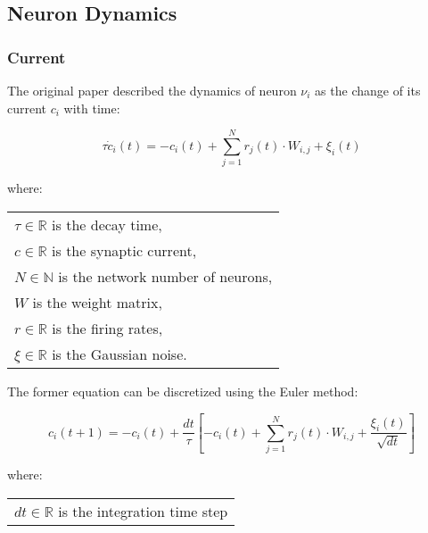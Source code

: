 \subsection{Neuron Dynamics}
\label{subsec:neuron_dynamics}


\subsubsection{Current}

The original paper described the dynamics of neuron \(\nu_{i}\) as the change of its current \(c_{i}\) with time:

        \begin{equation}
            \tau \dot{c}_{i}(t) = - {c}_{i}(t) + \sum_{j=1}^{N} r_{j}(t) \cdot W_{i,j} + \xi_{i}(t)
        \label{eq:continuous_dynamics} \end{equation}

        where:

        \begin{tabular}{l} \\
            \(\tau \in \mathbb{R}\) is the decay time, \\
            \(c \in \mathbb{R}\) is the synaptic current, \\
            \(N \in \mathbb{N}\) is the network number of neurons, \\
            \(W\) is the weight matrix, \\
            \(r \in \mathbb{R}\) is the firing rates, \\
            \(\xi \in \mathbb{R}\) is the Gaussian noise.
        \label{tab:conditions_continuous_dynamics} \end{tabular}



    The former equation can be discretized using the Euler method:

        \begin{equation}
            c_{i}(t+1) = -c_{i}(t) + \frac{dt}{\tau} \left[-c_{i}(t) + \sum_{j=1}^{N} r_{j}(t) \cdot W_{i,j} + \frac{\xi_{i}(t)}{\sqrt{dt}} \right]
        \label{eq:discrete_dynamics} \end{equation}

        where:

        \begin{tabular}{l}
            \(dt \in \mathbb{R}\) is the integration time step
        \label{tab:conditions_discrete_dynamics} \end{tabular}

